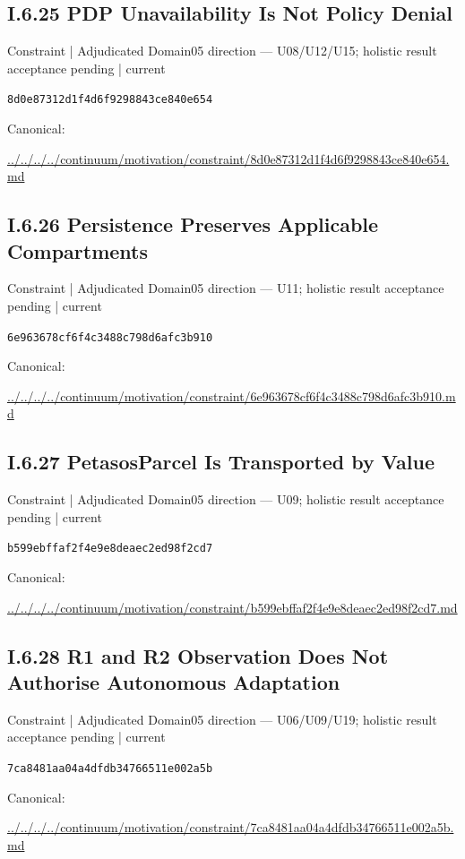 \documentclass[10pt,a4paper]{article}
\begin{document}
\subsection*{I.6.25 PDP Unavailability Is Not Policy Denial}
\label{element-8d0e87312d1f4d6f9298843ce840e654}
{\small Constraint | Adjudicated Domain05 direction — U08/U12/U15; holistic result acceptance pending | current}\par
\texttt{8d0e87312d1f4d6f9298843ce840e654}\par
Canonical: \par
{\footnotesize\url{../../../../continuum/motivation/constraint/8d0e87312d1f4d6f9298843ce840e654.md}}\par
\subsection*{I.6.26 Persistence Preserves Applicable Compartments}
\label{element-6e963678cf6f4c3488c798d6afc3b910}
{\small Constraint | Adjudicated Domain05 direction — U11; holistic result acceptance pending | current}\par
\texttt{6e963678cf6f4c3488c798d6afc3b910}\par
Canonical: \par
{\footnotesize\url{../../../../continuum/motivation/constraint/6e963678cf6f4c3488c798d6afc3b910.md}}\par
\subsection*{I.6.27 PetasosParcel Is Transported by Value}
\label{element-b599ebffaf2f4e9e8deaec2ed98f2cd7}
{\small Constraint | Adjudicated Domain05 direction — U09; holistic result acceptance pending | current}\par
\texttt{b599ebffaf2f4e9e8deaec2ed98f2cd7}\par
Canonical: \par
{\footnotesize\url{../../../../continuum/motivation/constraint/b599ebffaf2f4e9e8deaec2ed98f2cd7.md}}\par
\subsection*{I.6.28 R1 and R2 Observation Does Not Authorise Autonomous Adaptation}
\label{element-7ca8481aa04a4dfdb34766511e002a5b}
{\small Constraint | Adjudicated Domain05 direction — U06/U09/U19; holistic result acceptance pending | current}\par
\texttt{7ca8481aa04a4dfdb34766511e002a5b}\par
Canonical: \par
{\footnotesize\url{../../../../continuum/motivation/constraint/7ca8481aa04a4dfdb34766511e002a5b.md}}\par
\end{document}
